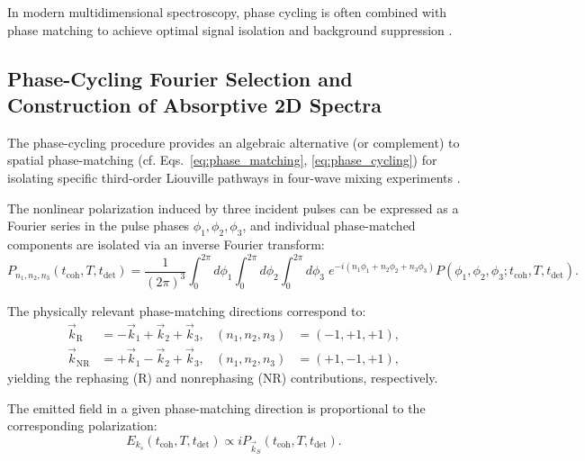 \noindent In modern multidimensional spectroscopy, phase cycling is often combined with phase matching to achieve optimal signal isolation and background suppression \cite{huang-fuetal2024developmentphasecyclinginterfacespecific, tianetal2003femtosecondphasecoherenttwodimensional}.

\subsection{Phase-Cycling Fourier Selection and Construction of Absorptive 2D Spectra}
\label{subsec:phase_cycling_fourier_selection}

\noindent The phase-cycling procedure provides an algebraic alternative (or complement) to spatial phase-matching (cf. Eqs.~\eqref{eq:phase_matching}, \eqref{eq:phase_cycling}) for isolating specific third-order Liouville pathways in four-wave mixing experiments \cite{mukamel1995principlesnonlinearoptical, cho2009twodimensionalopticalspectroscopy, jonas2003twodimensionalfemtosecondspectroscopy, brixneretal2004phasestabilizedtwodimensionalelectronic, greenetal2024vibrationalcoherenceshalfbroadband}.

\noindent The nonlinear polarization induced by three incident pulses can be expressed as a Fourier series in the pulse phases $\phi_1, \phi_2, \phi_3$, and individual phase-matched components are isolated via an inverse Fourier transform:
\begin{equation}
	P_{n_1,n_2,n_3}(t_{\text{coh}},T,t_{\text{det}}) =
	\frac{1}{(2\pi)^3} \int_{0}^{2\pi} \!\! d\phi_1
	\int_{0}^{2\pi} \!\! d\phi_2
	\int_{0}^{2\pi} \!\! d\phi_3 \;
	e^{-i(n_1\phi_1+n_2\phi_2+n_3\phi_3)}
	P(\phi_1,\phi_2,\phi_3;t_{\text{coh}},T,t_{\text{det}}).
	\label{eq:continuous_phase_cycling}
\end{equation}

\noindent The physically relevant phase-matching directions correspond to:
\begin{align}
	\vec{k}_{\mathrm{R}}  & = -\vec{k}_1 + \vec{k}_2 + \vec{k}_3,
	                      & (n_1,n_2,n_3)                         & = (-1,+1,+1), \label{eq:rephasing_selection}    \\
	\vec{k}_{\mathrm{NR}} & = +\vec{k}_1 - \vec{k}_2 + \vec{k}_3,
	                      & (n_1,n_2,n_3)                         & = (+1,-1,+1), \label{eq:nonrephasing_selection}
\end{align}
yielding the rephasing (R) and nonrephasing (NR) contributions, respectively.

\noindent The emitted field in a given phase-matching direction is proportional to the corresponding polarization:
\begin{equation}
	E_{k_s}(t_{\text{coh}},T,t_{\text{det}}) \propto i P_{\vec{k}_S}(t_{\text{coh}},T,t_{\text{det}}).
	\label{eq:field_polarization_relation}
\end{equation}

